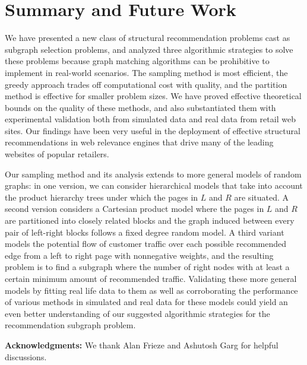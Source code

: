 \vspace{-0.1in}
\section{Summary and Future Work}
We have presented a new class of structural recommendation problems
cast as subgraph selection problems, and analyzed three algorithmic
strategies to solve these problems because graph matching algorithms can be
prohibitive to implement in real-world scenarios. The sampling method is most
efficient, the greedy approach trades off computational cost with
quality, and the partition method is effective for smaller problem
sizes. We have proved effective theoretical bounds on the quality
of these methods, and also substantiated them with experimental
validation both from simulated data and real data from
retail web sites. Our findings have been very useful in the
deployment of effective structural recommendations in web relevance
engines that drive many of the leading websites of popular retailers. \vs

Our sampling method and its analysis extends to more general
models of random graphs: in one version, we can consider
hierarchical models that take into account the product hierarchy
trees under which the pages in $L$ and $R$ are situated. A second
version considers a Cartesian product model where the pages in $L$
and $R$ are partitioned into closely related blocks and the graph
induced between every pair of left-right blocks follows a fixed
degree random model. A third variant models the potential flow of
customer traffic over each possible recommended edge from a left to
right page with nonnegative weights, and the resulting problem is
to find a subgraph where the number of right nodes with at least a
certain minimum amount of recommended traffic. Validating these
more general models by fitting real life data to them as well as
corroborating the performance of various methods in simulated and
real data for these models could yield an even better understanding
of our suggested algorithmic strategies for the 
recommendation subgraph problem.\vs

{\bf Acknowledgments:} We thank Alan Frieze and Ashutosh Garg for helpful
discussions.

\vspace{-.05in}